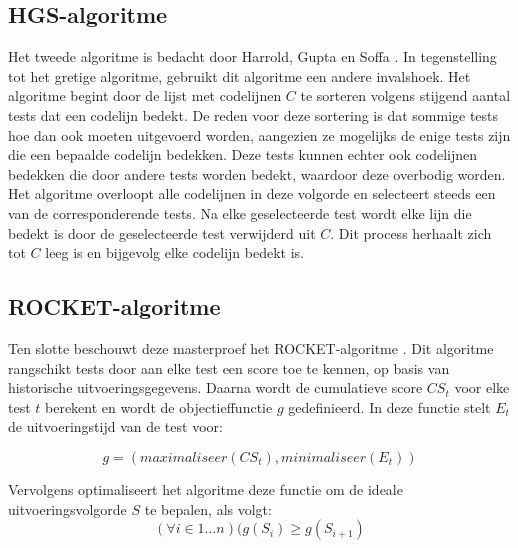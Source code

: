 \subsection{HGS-algoritme}
\noindent Het tweede algoritme is bedacht door Harrold, Gupta en Soffa \cite{hgs}. In tegenstelling tot het gretige algoritme, gebruikt dit algoritme een andere invalshoek. Het algoritme begint door de lijst met codelijnen $C$ te sorteren volgens stijgend aantal tests dat een codelijn bedekt. De reden voor deze sortering is dat sommige tests hoe dan ook moeten uitgevoerd worden, aangezien ze mogelijks de enige tests zijn die een bepaalde codelijn bedekken. Deze tests kunnen echter ook codelijnen bedekken die door andere tests worden bedekt, waardoor deze overbodig worden. Het algoritme overloopt alle codelijnen in deze volgorde en selecteert steeds een van de corresponderende tests. Na elke geselecteerde test wordt elke lijn die bedekt is door de geselecteerde test verwijderd uit $C$. Dit process herhaalt zich tot $C$ leeg is en bijgevolg elke codelijn bedekt is.

\subsection{ROCKET-algoritme}
\noindent Ten slotte beschouwt deze masterproef het ROCKET-algoritme \cite{6676952}. Dit algoritme rangschikt tests door aan elke test een score toe te kennen, op basis van historische uitvoeringsgegevens. Daarna wordt de cumulatieve score $CS_t$ voor elke test $t$ berekent en wordt de objectieffunctie $g$ gedefinieerd. In deze functie stelt $E_t$ de uitvoeringstijd van de test voor:

$$g = (maximaliseer(CS_t), minimaliseer(E_t))$$

\noindent Vervolgens optimaliseert het algoritme deze functie om de ideale uitvoeringsvolgorde $S$ te bepalen, als volgt:
$$(\forall i \in 1 \dots n)(g(S_i) \ge g(S_{i+1})$$